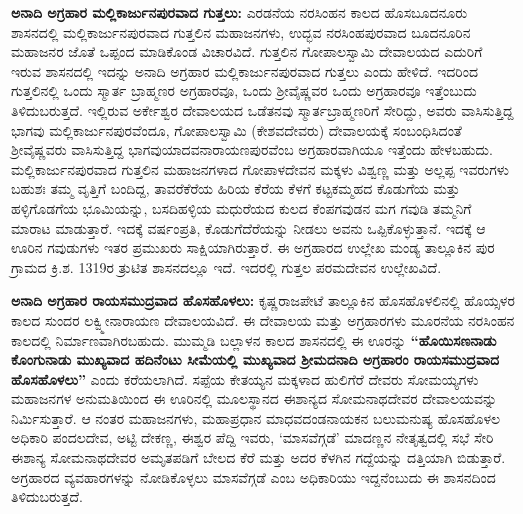 \textbf{ಅನಾದಿ ಅಗ್ರಹಾರ \general{\enginline{-}} ಮಲ್ಲಿಕಾರ್ಜುನಪುರವಾದ ಗುತ್ತಲು:} ಎರಡನೆಯ ನರಸಿಂಹನ ಕಾಲದ ಹೊಸಬೂದನೂರು ಶಾಸನದಲ್ಲಿ ಮಲ್ಲಿಕಾರ್ಜುನಪುರವಾದ ಗುತ್ತಲಿನ ಮಹಾಜನಗಳು, ಉದ್ಭವ ನರಸಿಂಹಪುರವಾದ ಬೂದನೂರಿನ ಮಹಾಜನರ ಜೊತೆ ಒಪ್ಪಂದ ಮಾಡಿಕೊಂಡ ವಿಚಾರವಿದೆ. ಗುತ್ತಲಿನ ಗೋಪಾಲಸ್ವಾಮಿ ದೇವಾಲಯದ ಎದುರಿಗೆ ಇರುವ ಶಾಸನದಲ್ಲಿ ಇದನ್ನು ಅನಾದಿ ಅಗ್ರಹಾರ ಮಲ್ಲಿಕಾರ್ಜುನಪುರವಾದ ಗುತ್ತಲು ಎಂದು ಹೇಳಿದೆ. ಇದರಿಂದ ಗುತ್ತಲಿನಲ್ಲಿ ಒಂದು ಸ್ಮಾರ್ತ ಬ್ರಾಹ್ಮಣರ ಅಗ್ರಹಾರವೂ, ಒಂದು ಶ‍್ರೀವೈಷ್ಣವರ ಒಂದು ಅಗ್ರಹಾರವೂ ಇತ್ತೆಂಬುದು ತಿಳಿದುಬರುತ್ತದೆ. ಇಲ್ಲಿರುವ ಅರ್ಕೇಶ್ವರ ದೇವಾಲಯದ ಒಡೆತನವು ಸ್ಮಾರ್ತಬ್ರಾಹ್ಮಣರಿಗೆ ಸೇರಿದ್ದು, ಅವರು ವಾಸಿಸುತ್ತಿದ್ದ ಭಾಗವು ಮಲ್ಲಿಕಾರ್ಜುನಪುರ\-ವೆಂದೂ, ಗೋಪಾಲಸ್ವಾಮಿ (ಕೇಶವದೇವರು) ದೇವಾಲಯಕ್ಕೆ ಸಂಬಂಧಿಸಿದಂತೆ ಶ‍್ರೀವೈಷ್ಣವರು ವಾಸಿಸುತ್ತಿದ್ದ ಭಾಗವು\break ಯಾದವನಾರಾಯಣಪುರವೆಂಬ ಅಗ್ರಹಾರವಾಗಿಯೂ ಇತ್ತೆಂದು ಹೇಳಬಹುದು. ಮಲ್ಲಿಕಾರ್ಜುನಪುರವಾದ ಗುತ್ತಲಿನ ಮಹಾಜನಗಳಾದ ಗೋಪಾಳದೇವನ ಮಕ್ಕಳು ವಿಶ್ವಣ್ಣ ಮತ್ತು ಅಲ್ಲಪ್ಪ ಇವರುಗಳು ಬಹುಶಃ ತಮ್ಮ ವೃತ್ತಿಗೆ ಬಂದಿದ್ದ, ತಾವರೆಕೆರೆಯ ಹಿರಿಯ ಕೆರೆಯ ಕೆಳಗೆ ಕಟ್ಟಕಮ್ಮಹದ ಕೊಡುಗೆಯ ಮತ್ತು ಹಳ್ಳಿಗೊಡಗೆಯ ಭೂಮಿಯನ್ನು, ಬಸದಿಹಳ್ಳಿಯ ಮಧುರೆಯದ ಕುಲದ ಕೆಂಪಗವುಡನ ಮಗ ಗವುಡಿ ತಮ್ಮನಿಗೆ ಮಾರಾಟ ಮಾಡುತ್ತಾರೆ. ಇದಕ್ಕೆ ವರ್ಷಂಪ್ರತಿ, ಕೊಡುಗೆದೆರೆಯನ್ನು ನೀಡಲು ಅವನು ಒಪ್ಪಿಕೊಳ್ಳುತ್ತಾನೆ. ಇದಕ್ಕೆ ಆ ಊರಿನ ಗವುಡುಗಳು ಇತರ ಪ್ರಮುಖರು ಸಾಕ್ಷಿಯಾಗಿರುತ್ತಾರೆ. ಈ ಅಗ್ರಹಾರದ ಉಲ್ಲೇಖ ಮಂಡ್ಯ ತಾಲ್ಲೂಕಿನ ಪುರ ಗ್ರಾಮದ ಕ್ರಿ.ಶ. 1319ರ ತ್ರುಟಿತ ಶಾಸನದಲ್ಲೂ ಇದೆ. ಇದರಲ್ಲಿ ಗುತ್ತಲ ಪರಮದೇವನ ಉಲ್ಲೇಖವಿದೆ.

\textbf{ಅನಾದಿ ಅಗ್ರಹಾರ ರಾಯಸಮುದ್ರವಾದ ಹೊಸಹೊಳಲು:} ಕೃಷ್ಣರಾಜಪೇಟೆ ತಾಲ್ಲೂಕಿನ ಹೊಸಹೊಳಲಿನಲ್ಲಿ ಹೊಯ್ಸಳರ ಕಾಲದ ಸುಂದರ ಲಕ್ವ್ಮೀನಾರಾಯಣ ದೇವಾಲಯವಿದೆ. ಈ ದೇವಾಲಯ ಮತ್ತು ಅಗ್ರಹಾರಗಳು ಮೂರನೆಯ ನರಸಿಂಹನ ಕಾಲದಲ್ಲಿ ನಿರ್ಮಾಣವಾಗಿರಬಹುದು. ಮುಮ್ಮಡಿ ಬಲ್ಲಾಳನ ಕಾಲದ ಶಾಸನದಲ್ಲಿ ಈ ಊರನ್ನು \textbf{“ಹೊಯಿಸಣನಾಡು ಕೊಂಗುನಾಡು ಮುಖ್ಯವಾದ ಹದಿನೆಂಟು ಸೀಮೆಯಲ್ಲಿ ಮುಖ್ಯವಾದ ಶ‍್ರೀಮದನಾದಿ ಅಗ್ರಹಾರಂ ರಾಯಸಮುದ್ರವಾದ ಹೊಸಹೊಳಲು”} ಎಂದು ಕರೆಯಲಾಗಿದೆ. ಸಪ್ಪೆಯ ಕೇತಯ್ಯನ ಮಕ್ಕಳಾದ ಹುಲಿಗೆರೆ ದೇವರು ಸೋಮಯ್ಯಗಳು ಮಹಾಜನಗಳ ಅನುಮತಿ\-ಯಿಂದ ಈ ಊರಿನಲ್ಲಿ ಮೂಲಸ್ಥಾನದ ಈಶಾನ್ಯದ ಸೋಮನಾಥದೇವರ ದೇವಾಲಯವನ್ನು ನಿರ್ಮಿಸುತ್ತಾರೆ. ಆ ನಂತರ ಮಹಾಜನಗಳು, ಮಹಾಪ್ರಧಾನ ಮಾಧವದಂಡನಾಯಕನ ಬಲುಮನುಷ್ಯ ಹೊಸಹೊಳಲ ಅಧಿಕಾರಿ ಪಂದಲದೇವ, ಅಟ್ಟಿ ದೇಕಣ್ಣ, ಈಶ್ವರ ಪೆದ್ದಿ ಇವರು, `ಮಾಸವೆಗ್ಗಡೆ' ಮಾದಣ್ಣನ ನೇತೃತ್ವದಲ್ಲಿ ಸಭೆ ಸೇರಿ ಈಶಾನ್ಯ ಸೋಮನಾಥದೇವರ ಅಮೃತಪಡಿಗೆ ಬೇಲದ ಕೆರೆ ಮತ್ತು ಅದರ ಕೆಳಗಿನ ಗದ್ದೆಯನ್ನು ದತ್ತಿಯಾಗಿ ಬಿಡುತ್ತಾರೆ. ಅಗ್ರಹಾರದ ವ್ಯವಹಾರಗಳನ್ನು ನೋಡಿಕೊಳ್ಳಲು ಮಾಸವೆಗ್ಗಡೆ ಎಂಬ ಅಧಿಕಾರಿಯು ಇದ್ದನೆಂಬುದು ಈ ಶಾಸನದಿಂದ ತಿಳಿದುಬರುತ್ತದೆ.


